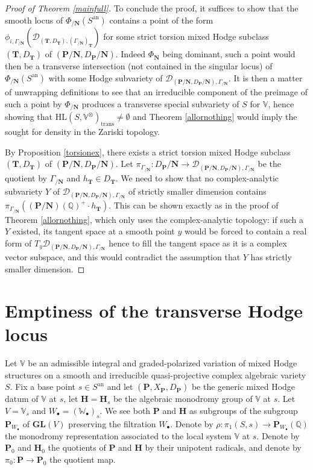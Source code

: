 \documentclass[10pt]{article}
\numberwithin{equation}{subsection}
\theoremstyle{plain}
\theoremstyle{definition}
\theoremstyle{remark}
\newcommand{\Q}{\mathbb Q}
\newcommand{\V}{\mathbb V}
\newcommand{\W}{\mathbb W}
\newcommand{\pp}{\mathbf P}
\newcommand{\mon}{\mathbf H}
\newcommand{\NN}{\mathbf N}
\newcommand{\HL}{\mathrm{HL}(S, \V^\otimes)}
\newcommand{\bul}{\bullet}
\newcommand{\an}{\mathrm{an}}
\newcommand{\gl}{\mathbf{GL}}
\newcommand{\period}{\mathscr{D}}
\newcommand{\trans}{\mathrm{trans}}
\begin{document}
\begin{proof}[Proof of Theorem \ref{mainfull}]
To conclude the proof, it suffices to show that the smooth locus of $\Phi_{/\NN}(S^\an)$ contains a point of the form $\phi_{i, \Gamma_{/\NN}}(\period_{(\mathbf{T}, D_{\mathbf{T}}), (\Gamma_{/\NN})_\mathbf{T}})$ for some strict torsion mixed Hodge subclass $(\mathbf{T}, D_{\mathbf{T}})$ of $(\pp/\NN, D_\pp/\NN)$. Indeed $\Phi_{\NN}$ being dominant, such a point would then be a transverse intersection (not contained in the singular locus) of $\Phi_{/\NN}(S^\an)$ with some Hodge subvariety of $\period_{(\pp/\NN, D_\pp/\NN), \Gamma_{/\NN}}$. It is then a matter of unwrapping definitions to see that an irreducible component of the preimage of such a point by $\Phi_{/\NN}$ produces a transverse special subvariety of $S$ for $\V$, hence showing that $\HL_\trans \neq \emptyset$ and Theorem \ref{allornothing} would imply the sought for density in the Zariski topology.

By Proposition \ref{torsionex}, there exists a strict torsion mixed Hodge subclass $(\mathbf{T}, D_{\mathbf{T}})$ of $(\pp/\NN, D_\pp/\NN)$. Let $\pi_{\Gamma_{/\NN}} : D_\pp/\NN \rightarrow \period_{(\pp/\NN, D_\pp/\NN), \Gamma_{/\NN}}$ be the quotient by $\Gamma_{/\NN}$ and $h_{\mathbf{T}} \in D_{\mathbf{T}}$. We need to show that no complex-analytic subvariety $Y$ of $\period_{(\pp/\NN, D_\pp/\NN), \Gamma_{/\NN}}$ of strictly smaller dimension contains $\pi_{\Gamma_{/\NN}}((\pp/\NN)(\Q)^+ \cdot h_{\mathbf{T}})$. This can be shown exactly as in the proof of Theorem \ref{allornothing}, which only uses the complex-analytic topology: if such a $Y$ existed, its tangent space at a smooth point $y$ would be forced to contain a real form of $T_y \period_{(\pp/\NN, D_\pp/\NN), \Gamma_{/\NN}}$ hence to fill the tangent space as it is a complex vector subspace, and this would contradict the assumption that $Y$ has strictly smaller dimension.
\end{proof}
\section{Emptiness of the transverse Hodge locus}\label{sect10}
Let $\V$ be an admissible integral and graded-polarized variation of mixed Hodge structures on a smooth and irreducible quasi-projective complex algebraic variety $S$. Fix a base point $s \in S^\an$ and let $(\pp, X_\pp, D_\pp)$ be the generic mixed Hodge datum of $\V$ at $s$, let $\mon = \mon_s$ be the algebraic monodromy group of $\V$ at $s$. Let $V = \V_s$ and $W_\bul = (\W_\bul)_s$. We see both $\pp$ and $\mon$ as subgroups of the subgroup $\pp_{W_\bul}$ of $\gl(V)$ preserving the filtration $W_\bul$. Denote by $\rho : \pi_1(S,s) \rightarrow \pp_{W_\bul}(\Q)$ the monodromy representation associated to the local system $\V$ at $s$. Denote by $\pp_0$ and $\mon_0$ the quotients of $\pp$ and $\mon$ by their unipotent radicals, and denote by $\pi_0 : \pp \rightarrow \pp_0$ the quotient map.
\end{document}
